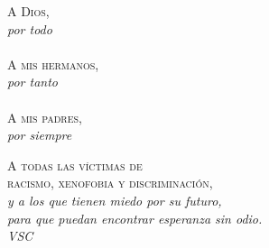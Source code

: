 \pagestyle{empty}

\begin{flushright}
\textsc{A Dios,} \hspace{1cm} ${}$\\
\textit{por todo}\\
\textit{ }\\
\textsc{A mis hermanos,} \hspace{1.2cm} ${}$\\
\textit{por tanto}\\
\textit{ }\\
\textsc{A mis padres,} \hspace{1.6cm} ${}$\\
\textit{por siempre}\\
\textit{ }
\end{flushright}
\vspace{7cm}
\begin{center}
\textsc{A todas las víctimas de}\\
\textsc{racismo, xenofobia y discriminación,}\\
\textit{y a los que tienen miedo por su futuro,}\\
\textit{para que puedan encontrar esperanza sin odio.}\\
\vspace{0.5cm}
\textit{VSC}
\end{center}